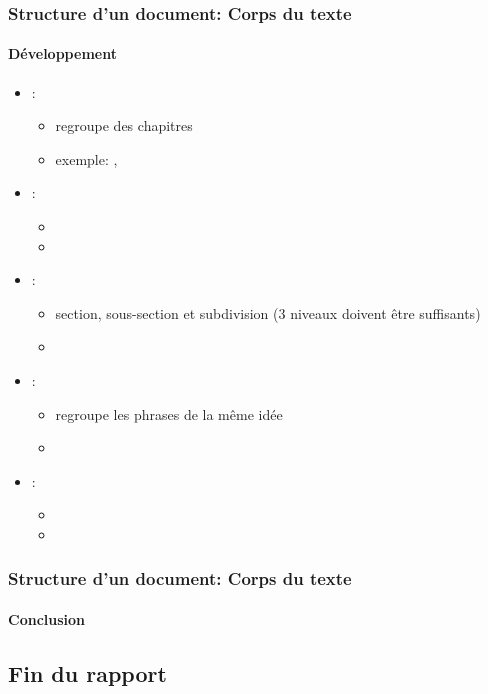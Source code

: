 \documentclass[xcolor=table]{beamer}
\begin{document}
\begin{frame}
\frametitle{Structure d'un document: Corps du texte}
\framesubtitle{Développement}

\begin{itemize}
	\item {}: 
	\begin{itemize}
		\item regroupe des chapitres
		\item exemple: , 
	\end{itemize}

	\item {}:
	\begin{itemize}
		\item 
		\item 
	\end{itemize}

	\item {}: 
	\begin{itemize}
		\item section, sous-section et subdivision (3 niveaux doivent être suffisants)
		\item 
	\end{itemize}

	\item {}: 
	\begin{itemize}
		\item regroupe les phrases de la même idée
		\item 
	\end{itemize}

	\item {}:
	\begin{itemize}
		\item 
		\item 
	\end{itemize}
\end{itemize}

\end{frame}


\begin{frame}
\frametitle{Structure d'un document: Corps du texte}
\framesubtitle{Conclusion}

\end{frame}

\subsection{Fin du rapport}
\end{document}
